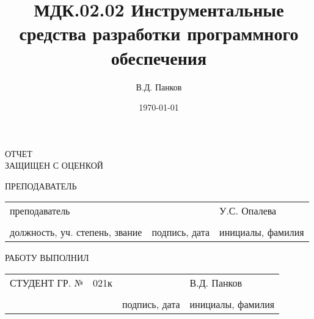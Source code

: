 \documentclass[a4paper,14pt]{extarticle}
\author{В.Д. Панков}
\date{\today}
\title{МДК.02.02 Инструментальные средства разработки программного обеспечения}
\begin{document}
\begin{titlepage}


\vspace{32pt}


\vspace{60pt}

\raggedright{ОТЧЕТ \\
ЗАЩИЩЕН С ОЦЕНКОЙ}
\vspace{14pt}

\raggedright{ПРЕПОДАВАТЕЛЬ}

\vspace{12pt}

\begin{tabularx}{\textwidth}{ >{\centering\arraybackslash}X >{\centering\arraybackslash}X >{\centering\arraybackslash}X }
	 преподаватель & & У.С. Опалева \\ 
	 \hrulefill & \hrulefill & \hrulefill \\ 
\footnotesize{должность, уч. степень, звание} & \footnotesize{подпись, дата} & \footnotesize{инициалы, фамилия} \\ 
\end{tabularx} 
 
\vspace{48pt} 


\vspace{76pt} 


\vspace*{\fill} 

\raggedright{РАБОТУ ВЫПОЛНИЛ} 

\vspace{10pt} 

\begin{tabularx}{\textwidth}{>{\raggedright\arraybackslash}X  >{\centering\arraybackslash}X >{\centering\arraybackslash}X >{\centering\arraybackslash}X }
	 СТУДЕНТ ГР. № & 021к & & В.Д. Панков \\ 
	 & \hrulefill & \hrulefill & \hrulefill \\ 
	 &  & \footnotesize{подпись, дата} & \footnotesize{инициалы, фамилия} \\ 
\end{tabularx} 
 
\vspace*{\fill} 


\end{titlepage}
\end{document}
